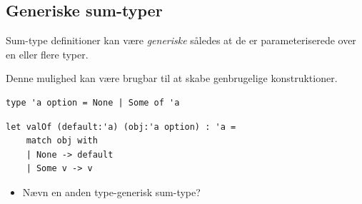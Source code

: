 \documentclass[rgb]{beamer}
\begin{document}
\subsection{Generiske sum-typer}
\begin{frame}[fragile]
\begin{footnotesize}

  \vspace{1ex}

  Sum-type definitioner kan være \emph{generiske} således at de er
  parameteriserede over en eller flere typer.

  \vspace{1ex}

  Denne mulighed kan være brugbar til at skabe genbrugelige konstruktioner.

  \vspace{1ex}


\begin{lstlisting}[numbers=none,frame=none,mathescape]
  type 'a option = None | Some of 'a
\end{lstlisting}

  \vspace{1ex}
\begin{lstlisting}[numbers=none,frame=none,mathescape]
  let valOf (default:'a) (obj:'a option) : 'a =
    match obj with
    | None -> default
    | Some v -> v
\end{lstlisting}

  \vspace{1ex}

\begin{itemize}
\item Nævn en anden type-generisk sum-type?
\end{itemize}

\end{footnotesize}
\end{frame}
\end{document}
